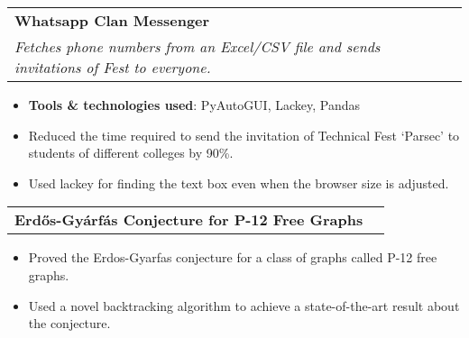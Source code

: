 \documentclass[a4paper,11pt]{article}
\makeatletter
\newcommand{\github}[1]{%
   \href{#1}{\faGithub}%
}
\newcommand{\resumeProject}[4]{
\vspace{0.5mm}\item
    \begin{tabular*}{0.98\textwidth}[t]{l@{\extracolsep{\fill}}r}
        \textbf{#1} & \textit{\footnotesize{#3}} \\
        \footnotesize{\textit{#2}} & \footnotesize{#4}
    \end{tabular*}
    \vspace{-2.4mm}
}
\newcommand{\resumeProjectNoSmallLine}[2]{
\vspace{0.5mm}\item
    \begin{tabular*}{0.98\textwidth}[t]{l@{\extracolsep{\fill}}r}
        \textbf{#1} & \textit{\footnotesize{#2}} \\
    \end{tabular*}
    \vspace{-2.4mm}
}
\newcommand{\resumeItemListStart}{\begin{justify}\begin{itemize}[leftmargin=3ex, rightmargin=2ex, noitemsep,labelsep=1.2mm,itemsep=0mm, label=\textbullet]\small}
\newcommand{\resumeItemListEnd}{\end{itemize}\end{justify}\vspace{-2mm}}
\makeatother
\begin{document}
    
    \resumeProject
      {Whatsapp Clan Messenger} %
      {Fetches phone numbers from an Excel/CSV file and sends invitations of Fest to everyone.} %
      {} %
      {\github{https://github.com/pavanvpatil/Whatsapp-Clan-Messenger}} %
      \resumeItemListStart
        \item {\textbf{Tools \& technologies used}: PyAutoGUI, Lackey, Pandas}
        \item {Reduced the time required to send the invitation of Technical Fest `Parsec' to students of different colleges by 90\%.}
        \item Used lackey for finding the text box even when the browser size is adjusted.
      \resumeItemListEnd

      
      
    
    \resumeProjectNoSmallLine
      {Erdős-Gyárfás Conjecture for P-12 Free Graphs } %
      {} %
      \resumeItemListStart
        \item { Proved the Erdos-Gyarfas conjecture for a class of graphs called P-12 free graphs.}
        \item { Used a novel backtracking algorithm to achieve a state-of-the-art result about the conjecture.}
    \resumeItemListEnd
\end{document}
